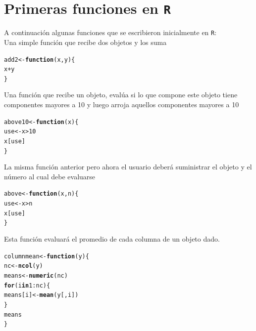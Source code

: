 \documentclass{article}\usepackage[]{graphicx}\usepackage[]{color}
\makeatletter
\newcommand{\hlnum}[1]{\textcolor[rgb]{0.686,0.059,0.569}{#1}}%
\newcommand{\hlopt}[1]{\textcolor[rgb]{0,0,0}{#1}}%
\newcommand{\hlstd}[1]{\textcolor[rgb]{0.345,0.345,0.345}{#1}}%
\newcommand{\hlkwa}[1]{\textcolor[rgb]{0.161,0.373,0.58}{\textbf{#1}}}%
\newcommand{\hlkwb}[1]{\textcolor[rgb]{0.69,0.353,0.396}{#1}}%
\newcommand{\hlkwc}[1]{\textcolor[rgb]{0.333,0.667,0.333}{#1}}%
\newcommand{\hlkwd}[1]{\textcolor[rgb]{0.737,0.353,0.396}{\textbf{#1}}}%
\newenvironment{kframe}{%
 \def\at@end@of@kframe{}%
 \ifinner\ifhmode%
  \def\at@end@of@kframe{\end{minipage}}%
  \begin{minipage}{\columnwidth}%
 \fi\fi%
 \def\FrameCommand##1{\hskip\@totalleftmargin \hskip-\fboxsep
 \colorbox{shadecolor}{##1}\hskip-\fboxsep
     \hskip-\linewidth \hskip-\@totalleftmargin \hskip\columnwidth}%
 \MakeFramed {\advance\hsize-\width
   \@totalleftmargin\z@ \linewidth\hsize
   \@setminipage}}%
 {\par\unskip\endMakeFramed%
 \at@end@of@kframe}
\newenvironment{knitrout}{}{} %
\makeatother
\begin{document}
\section{Primeras funciones en \texttt{R}}

A continuación algunas funciones que se escribieron inicialmente en \texttt{R}:\\

Una simple función que recibe dos objetos y los suma
\begin{knitrout}
\color{fgcolor}\begin{kframe}
\begin{alltt}
\hlstd{add2} \hlkwb{<-} \hlkwa{function}\hlstd{(}\hlkwc{x}\hlstd{,} \hlkwc{y}\hlstd{) \{}
    \hlstd{x} \hlopt{+} \hlstd{y}
\hlstd{\}}
\end{alltt}
\end{kframe}
\end{knitrout}

Una función que recibe un objeto, evalúa si lo que compone este objeto tiene componentes mayores a 10 y luego arroja aquellos componentes mayores a 10   
\begin{knitrout}
\color{fgcolor}\begin{kframe}
\begin{alltt}
\hlstd{above10} \hlkwb{<-} \hlkwa{function}\hlstd{(}\hlkwc{x}\hlstd{)\{}
      \hlstd{use} \hlkwb{<-} \hlstd{x} \hlopt{>} \hlnum{10}
      \hlstd{x[use]}
\hlstd{\}}
\end{alltt}
\end{kframe}
\end{knitrout}

La misma función anterior pero ahora el usuario deberá suministrar el objeto y el número al cual debe evaluarse
\begin{knitrout}
\color{fgcolor}\begin{kframe}
\begin{alltt}
\hlstd{above} \hlkwb{<-} \hlkwa{function}\hlstd{(}\hlkwc{x}\hlstd{,} \hlkwc{n}\hlstd{)\{}
  \hlstd{use} \hlkwb{<-} \hlstd{x} \hlopt{>} \hlstd{n}
  \hlstd{x[use]}
\hlstd{\}}
\end{alltt}
\end{kframe}
\end{knitrout}

Esta función evaluará el promedio de cada columna de un objeto dado.
\begin{knitrout}
\color{fgcolor}\begin{kframe}
\begin{alltt}
\hlstd{columnmean} \hlkwb{<-} \hlkwa{function}\hlstd{(}\hlkwc{y}\hlstd{) \{}
  \hlstd{nc} \hlkwb{<-} \hlkwd{ncol}\hlstd{(y)}
  \hlstd{means} \hlkwb{<-} \hlkwd{numeric}\hlstd{(nc)}
    \hlkwa{for}\hlstd{(i} \hlkwa{in} \hlnum{1}\hlopt{:}\hlstd{nc) \{}
      \hlstd{means[i]} \hlkwb{<-} \hlkwd{mean}\hlstd{(y[, i])}
    \hlstd{\}}
  \hlstd{means}
\hlstd{\}}
\end{alltt}
\end{kframe}
\end{knitrout}
\end{document}
